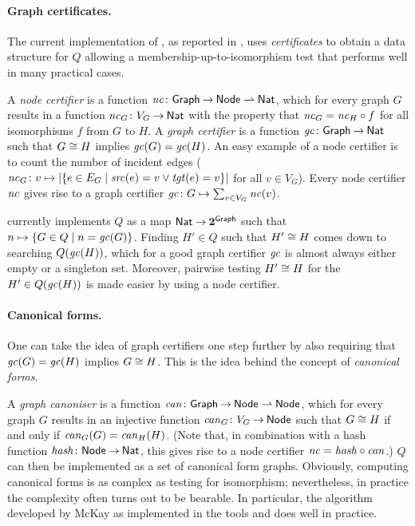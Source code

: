 \vspace*{-\medskipamount}
\paragraph{Graph certificates.}

The current implementation of \GROOVE, as reported in \cite{Rensink2006}, uses
\emph{certificates} to obtain a data structure for $Q$ allowing a
membership-up-to-isomorphism test that performs well in many practical cases.

A \emph{node certifier} is a function $\mathit{nc}\colon {\mathsf{Graph}} \mathbin{\rightarrow} {\mathsf{Node}\rightharpoonup\mathsf{Nat}}$, which
for every graph $G$ results in a function $\mathit{nc}_G\colon {V_G} \mathbin{\rightarrow} {\mathsf{Nat}}$ with the
property that $\mathit{nc}_G=\mathit{nc}_H\circ f$ for all isomorphisms $f$ from $G$ to $H$. A
\emph{graph certifier} is a function $\mathit{gc}\colon {\mathsf{Graph}} \mathbin{\rightarrow} {\mathsf{Nat}}$ such that $G\cong H$
implies $\mathit{gc}(G)=\mathit{gc}(H)$. An easy example of a node certifier is to count the
number of incident edges ($\mathit{nc}_G\colon v\mapsto |{\textstyle\mathopen\{ e\in E_G \mid \mathit{src}(e)=v
\vee \mathit{tgt}(e)=v \mathclose\}}|$ for all $v\in V_G$). Every node certifier $\mathit{nc}$
gives rise to a graph certifier $\mathit{gc}\colon G\mapsto \sum_{v\in V_G} \mathit{nc}(v)$.

\GROOVE currently implements $Q$ as a map $\mathsf{Nat} \mathbin{\rightarrow} {\mathbf 2}^{\mathsf{Graph}}$
such that $n\mapsto {\textstyle\mathopen\{ G\in Q \mid n=\mathit{gc}(G) \mathclose\}}$. Finding $H'\in Q$ such that
$H'\cong H$ comes down to searching $Q(\mathit{gc}(H))$, which for a good graph
certifier $\mathit{gc}$ is almost always either empty or a singleton set. Moreover,
pairwise testing $H'\cong H$ for the $H'\in Q(\mathit{gc}(H))$ is made easier by using a
node certifier.

\vspace*{-\medskipamount}
\paragraph{Canonical forms.}

One can take the idea of graph certifiers one step further by also requiring
that $\mathit{gc}(G)=\mathit{gc}(H)$ implies $G\cong H$. This is the idea behind the concept of
\emph{canonical forms}.

A \emph{graph canoniser} is a function $\mathit{can}\colon {\mathsf{Graph}} \mathbin{\rightarrow} {\mathsf{Node}\rightharpoonup \mathsf{Node}}$,
which for every graph $G$ results in an injective function
$\mathit{can}_G\colon {V_G} \mathbin{\rightarrow} {\mathsf{Node}}$ such that $G\cong H$ if and only if
$\mathit{can}_G(G)=\mathit{can}_H(H)$. (Note that, in combination with a hash function
$\mathit{hash}\colon {\mathsf{Node}} \mathbin{\rightarrow} {\mathsf{Nat}}$, this gives rise to a node certifier $\mathit{nc}=\mathit{hash}\circ
\mathit{can}$.) $Q$ can then be implemented as a set of canonical form graphs.
Obviously, computing canonical forms is as complex as testing for isomorphism;
nevertheless, in practice the complexity often turns out to be bearable. In
particular, the algorithm developed by McKay \cite{McKay1981} as implemented in
the tools \NAUTY \cite{NAUTY} and \BLISS \cite{BLISS} does well in practice.

